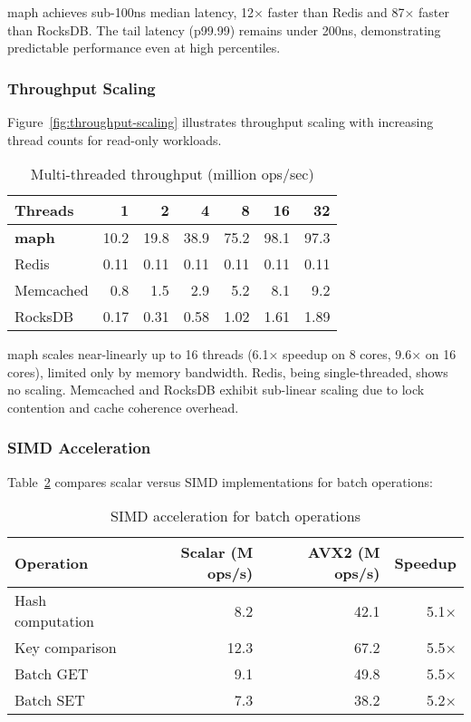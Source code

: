 \documentclass[10pt,conference]{IEEEtran}
\begin{document}
maph achieves sub-100ns median latency, 12× faster than Redis and 87× faster than RocksDB. The tail latency (p99.99) remains under 200ns, demonstrating predictable performance even at high percentiles.

\subsubsection{Throughput Scaling}
Figure~\ref{fig:throughput-scaling} illustrates throughput scaling with increasing thread counts for read-only workloads.

\begin{table}[htbp]
\centering
\caption{Multi-threaded throughput (million ops/sec)}
\label{tab:throughput}
\begin{tabular}{lrrrrrr}
\toprule
Threads & 1 & 2 & 4 & 8 & 16 & 32 \\
\midrule
\textbf{maph} & 10.2 & 19.8 & 38.9 & 75.2 & 98.1 & 97.3 \\
Redis & 0.11 & 0.11 & 0.11 & 0.11 & 0.11 & 0.11 \\
Memcached & 0.8 & 1.5 & 2.9 & 5.2 & 8.1 & 9.2 \\
RocksDB & 0.17 & 0.31 & 0.58 & 1.02 & 1.61 & 1.89 \\
\bottomrule
\end{tabular}
\end{table}

maph scales near-linearly up to 16 threads (6.1× speedup on 8 cores, 9.6× on 16 cores), limited only by memory bandwidth. Redis, being single-threaded, shows no scaling. Memcached and RocksDB exhibit sub-linear scaling due to lock contention and cache coherence overhead.

\subsubsection{SIMD Acceleration}
Table~\ref{tab:simd} compares scalar versus SIMD implementations for batch operations:

\begin{table}[htbp]
\centering
\caption{SIMD acceleration for batch operations}
\label{tab:simd}
\begin{tabular}{lrrr}
\toprule
Operation & Scalar (M ops/s) & AVX2 (M ops/s) & Speedup \\
\midrule
Hash computation & 8.2 & 42.1 & 5.1× \\
Key comparison & 12.3 & 67.2 & 5.5× \\
Batch GET & 9.1 & 49.8 & 5.5× \\
Batch SET & 7.3 & 38.2 & 5.2× \\
\bottomrule
\end{tabular}
\end{table}
\end{document}
